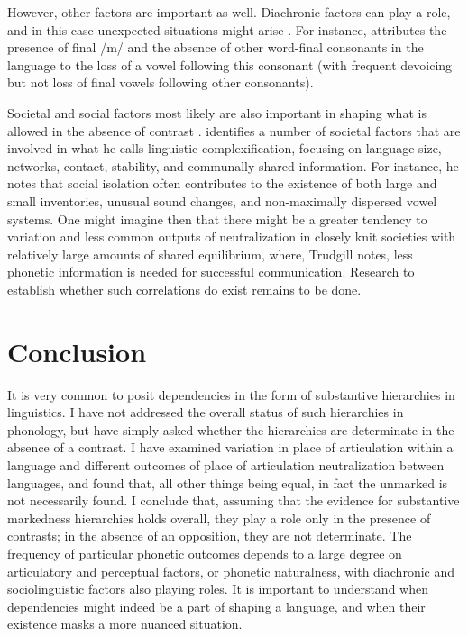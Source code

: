 \documentclass[output=paper]{langsci/langscibook}
\begin{document}
 However, other factors are important as well. Diachronic factors can play a role, and in this case unexpected situations might arise \citep[see, for instance][]{Blevins2004}. For instance, \citet{Blust1984} attributes the presence of final /m/ and the absence of other word-final consonants in the  language  to the loss of a vowel following this consonant (with frequent devoicing but not loss of final vowels following other consonants). 

Societal and social factors most likely are also important in shaping what is allowed in the absence of contrast \citep[see, for instance,][]{Guy2011}. \citet{Trudgill2011} identifies a number of societal factors that are involved in what he calls linguistic complexification, focusing on language size, networks, contact, stability, and communally-shared information. For instance, he notes that social isolation often contributes to the existence of both large and small inventories, unusual sound changes, and non-maximally dispersed vowel systems. One might imagine then that there might be a greater tendency to variation and less common outputs of neutralization in closely knit societies with relatively large amounts of shared equilibrium, where, Trudgill notes, less phonetic information is needed for successful communication. Research to establish whether such correlations do exist remains to be done.

\section{Conclusion}
\largerpage
It is very common to posit dependencies in the form of substantive hierarchies in linguistics. I have not addressed the overall status of such hierarchies in phonology, but have simply asked whether the hierarchies are determinate in the absence of a contrast. I have examined variation in place of articulation within a language and different outcomes of place of articulation neutralization between languages, and found that, all other things being equal, in fact the unmarked is not necessarily found. I conclude that, assuming that the evidence for substantive markedness hierarchies holds overall, they play a role only in the presence of contrasts; in the absence of an opposition, they are not determinate. The frequency of particular phonetic outcomes depends to a large degree on articulatory and perceptual factors, or phonetic naturalness, with diachronic and sociolinguistic factors also playing roles. It is important to understand when dependencies might indeed be a part of shaping a language, and when their existence masks a more nuanced situation.


{\sloppy
\printbibliography[heading=subbibliography,notkeyword=this]
}
\end{document}
